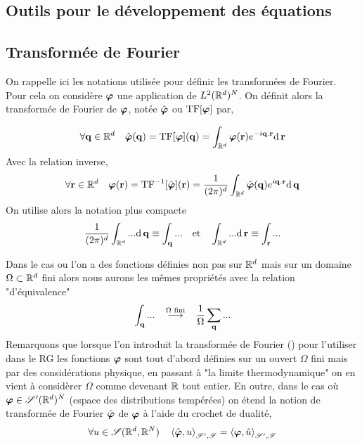 \documentclass[10pt]{article}
\begin{document}
\begin{multicols}{2}
\section{Outils pour le développement des équations}

\label{ann:outils}

\subsection{Transformée de Fourier}

On rappelle ici les notations utilisée pour définir les transformées de Fourier. Pour cela on considère $\boldsymbol{ \varphi}$ une application de $L^2(\mathbb{R}^d)^N$. On définit alors la transformée de Fourier de $\boldsymbol{ \varphi}$, notée $\hat{\boldsymbol{ \varphi}}$ ou $\text{TF}[\boldsymbol{ \varphi}]$ par, 

\begin{equation}
  \forall {\bf q} \in \mathbb{R}^d \quad \hat{\boldsymbol{ \varphi}}({\bf q}) = \text{TF}[\boldsymbol{ \varphi}]({\bf q}) = \int_{\mathbb{R}^d} \boldsymbol{ \varphi}({\bf r}) e^{-i{\bf q}.{\bf r}}\text{d} \,{\bf r}
\end{equation}
Avec la relation inverse,
\begin{equation}
  \forall {\bf r} \in \mathbb{R}^d \quad \boldsymbol{ \varphi}({\bf r})  = \text{TF}^{-1}[\hat{\boldsymbol{ \varphi}}]({\bf r}) = \frac{1}{(2\pi)^d}\int_{\mathbb{R}^d} \hat{\boldsymbol{ \varphi}}({\bf q}) e^{i{\bf q}.{\bf r}}\text{d} \,{\bf q}
\end{equation}
On utilise alors la notation plus compacte 
\begin{equation}
  \frac{1}{(2\pi)^d}\int_{\mathbb{R}^d} ... \text{d} \,{\bf q} \equiv \int_{\bf q} ... \quad \text{et} \quad  \int_{\mathbb{R}^d} ... \text{d} \,{\bf r} \equiv \int_{\bf r} ... 
\end{equation}

Dans le cas ou l'on a des fonctions définies non pas sur $\mathbb{R}^d$ mais sur un domaine $\Omega \subset \mathbb{R}^d$ fini alors nous aurons les mêmes propriétés avec la relation "d'équivalence"  
\begin{equation}
	 \int_{{\bf q}} ... \overset{\text{$\Omega$ fini}}{\quad \longrightarrow \quad } \frac{1}{\Omega} \sum_{{\bf q}} ...
\end{equation}
Remarquons que lorsque l'on introduit la transformée de Fourier () pour l'utiliser dans le RG les fonctions $\boldsymbol{ \varphi}$ sont tout d'abord définies sur un ouvert $\Omega$ fini mais par des considérations physique, en passant à "la limite thermodynamique" on en vient à considèrer $\Omega$ comme devenant $\mathbb{R}$ tout entier. En outre, dans le cas où $\boldsymbol{ \varphi} \in \mathscr{S}'(\mathbb{R}^d)^N$ (espace des distributions tempérées) on étend la notion de transformée de Fourier $\hat{\boldsymbol{ \varphi}}$ de $\boldsymbol{ \varphi}$ à l'aide du crochet de dualité, 
\begin{equation}
  \forall u \in \mathscr{S}(\mathbb{R}^d, \mathbb{R}^N) \quad \left< \hat{\boldsymbol{ \varphi}}, u \right>_{\mathscr{S}', \mathscr{S}} = \left< \boldsymbol{ \varphi}, \hat{u} \right>_{\mathscr{S}', \mathscr{S}}
\end{equation}


\end{multicols}
\end{document}
